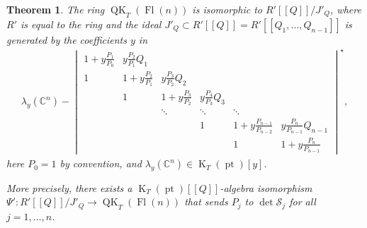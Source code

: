 \documentclass[11pt]{article}
\numberwithin{equation}{section}
\numberwithin{equation}{section}
\newtheorem{Theorem}{Theorem}[section]
\theoremstyle{definition}
\newcommand{\dbb}[1]{[\![#1]\!]}
\DeclareMathOperator{\Fl}{Fl}
\DeclareMathOperator{\QK}{QK}
\DeclareMathOperator{\K}{K}
\DeclareMathOperator{\pt}{pt}
\newcommand{\C}{{\mathbb C}}
\newcommand{\cS}{{\mathcal S}}
\begin{document}
\begin{Theorem}\label{thm:toda}
The ring $\QK_T(\Fl(n))$ is isomorphic to $R'[\![Q]\!]/J'_Q$, where $R'$ is equal to the ring \smash{$\K_T(\pt)\bigl[P_1^{\pm },\dots,P_{n}^\pm\bigr]$} and the ideal $J'_Q\subset R'\dbb{Q}=R'\dbb{Q_1,\dots,Q_{n-1}}$ is generated by the coefficients $y$ in
 \begin{gather}\label{eqn:toda}
 \lambda_y(\C^n) -
 \begin{vmatrix}
 1+y\frac{P_1}{P_0} & y\frac{P_2}{P_1}Q_1 & & & & \\[0.9mm]
 1 & 1+y\frac{P_2}{P_1} & y\frac{P_3}{P_2}Q_2 & & & \\[0.9mm]
 & 1 & 1+y\frac{P_3}{P_2} & y\frac{P_{4}}{P_{3}}Q_3 & & \\
 & & \ddots & \ddots & \ddots & \\
& & & 1 & 1+y\frac{P_{n-1}}{P_{n-2}} & y\frac{P_n}{P_{n-1}}Q_{n-1}\\[1mm]
& & & & 1 & 1+y\frac{P_n}{P_{n-1}}
\end{vmatrix}^\star,
\end{gather}
here $P_0=1$ by convention, and $\lambda_y(\C^n)\in\K_T(\pt)[y]$.

More precisely,
there exists a $\K_T(\pt)[\![Q]\!]$-algebra isomorphism $\Psi'\colon R'[\![Q]\!]/J'_Q \to \QK_T(\Fl(n))$ that sends $P_j$ to $\det \cS_j$ for all $j=1,\dots,n$.
\end{Theorem}
\end{document}
